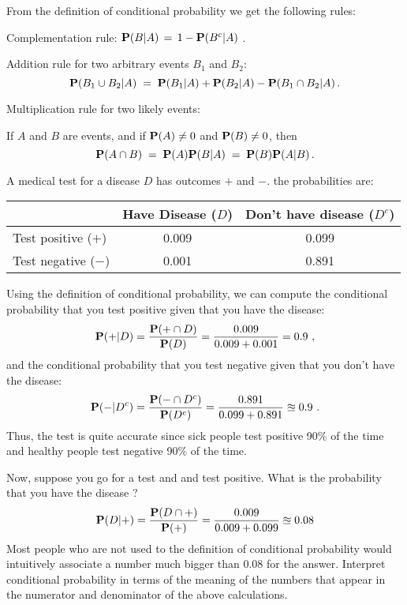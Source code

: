 From the definition of conditional probability we get the following rules:
\be
\item Complementation rule: $\mathbf{P}(B | A)\, = \,1 - \mathbf{P}(B^c | A)$ .

\item Addition rule for two arbitrary events $B_1$ and $B_2$: \[{\mathbf{P}(B_1 \cup B_2 | A) \;= \;\mathbf{P}(B_1 | A) + \mathbf{P}(B_2 | A) - \mathbf{P}(B_1\cap B_2|A)}\,.\]

\item Multiplication rule for two likely events: 

If $A$ and $B$ are events, and if
  $\mathbf{P}(A)\neq 0$ and  $\mathbf{P}(B)\neq 0$, then
\[\mathbf{P}(A\cap B)\;=\;\mathbf{P}(A)\mathbf{P}(B|A)\;=\;\mathbf{P}(B)\mathbf{P}(A|B)\,. \]
\ee

\begin{example}[Wasserman03, p.~11]\label{EX:Wasserman03p11}
 A medical test for a disease $D$ has outcomes $+$ and $-$.  the probabilities are:
\begin{center}
 \begin{tabular}{l | c | c}
 \hline
 & Have Disease ($D$) & Don't have disease ($D^c$)  \\ \hline
Test positive ($+$) & 0.009 & 0.099 \\
 Test negative ($-$) & 0.001 & 0.891\\ \hline
 \end{tabular}
 \end{center}
 Using the definition of conditional probability, we can compute the conditional probability that you test positive given that you have the disease:
 \[
 \mathbf{P}(+ | D) = \frac{\mathbf{P}(+ \cap D)}{\mathbf{P}(D)} = \frac{0.009}{0.009+0.001}=0.9 \ ,
 \]
 and the conditional probability that you test negative given that you don't have the disease:
 \[
 \mathbf{P}(- | D^c) = \frac{\mathbf{P}(- \cap D^c)}{\mathbf{P}(D^c)} = \frac{0.891}{0.099+0.891} \approxeq 0.9 \ .
 \]
 Thus, the test is quite accurate since sick people test positive 90\% of the time and healthy people test negative 90\% of the time.
 
Now, suppose you go for a test and and test positive.  What is the probability that you have the disease ?
 \[
 \mathbf{P}(D|+) = \frac{\mathbf{P}(D \cap +)}{\mathbf{P}(+)} = \frac{0.009}{0.009+0.099} \approxeq 0.08
 \]
Most people who are not used to the definition of conditional probability would intuitively associate a number much bigger than $0.08$ for the answer.  Interpret conditional probability in terms of the meaning of the numbers that appear in the numerator and denominator of the above calculations.
\end{example}
 
